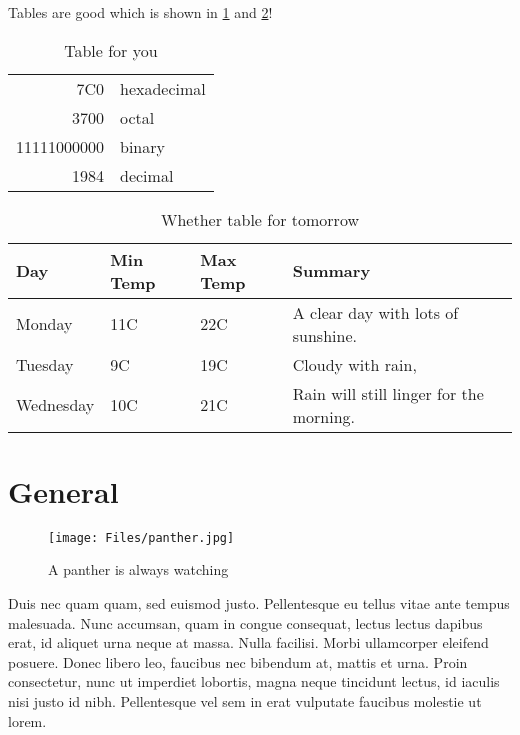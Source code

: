 


Tables are good \cite{ATraveler} which is shown in \ref{table: you} and
\ref{table: whether}!
\begin{table}[ht!]
    \centering
    \begin{tabular}{|r|l|}
        \hline
        7C0 & hexadecimal \\
        3700 & octal \\ \cline{2-2}
        11111000000 & binary \\
        \hline \hline
        1984 & decimal \\
        \hline
    \end{tabular}
    \caption[You-table]{Table for you}
    \label{table: you} %
\end{table}

\begin{table}[ht] 
    \centering
    \begin{tabular}{ | l | l | l | p{5cm} |}
        \hline
        Day & Min Temp & Max Temp & Summary \\ \hline
        Monday & 11C & 22C & A clear day with lots of sunshine. \\ \hline
        Tuesday & 9C & 19C & Cloudy with rain, \\ \hline
        Wednesday & 10C & 21C & Rain will still linger for the morning.\\
        \hline
    \end{tabular}
    \caption[Weather table]{Whether table for tomorrow}
    \label{table: whether}
\end{table}

\section{General}

\begin{figure}
    \centering
    \texttt{[image: Files/panther.jpg]}
    \caption[The panther]{A panther is always watching}
    \label{fig: jordan}
\end{figure}

Duis nec quam quam, sed euismod justo. Pellentesque eu tellus vitae ante tempus malesuada. Nunc accumsan, quam in congue consequat, lectus lectus dapibus erat, id aliquet urna neque at massa. Nulla facilisi. Morbi ullamcorper eleifend posuere. Donec libero leo, faucibus nec bibendum at, mattis et urna. Proin consectetur, nunc ut imperdiet lobortis, magna neque tincidunt lectus, id iaculis nisi justo id nibh. Pellentesque vel sem in erat vulputate faucibus molestie ut lorem.


